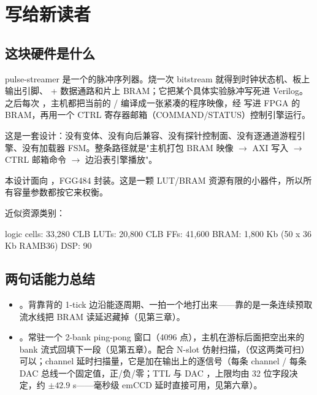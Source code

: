 \documentclass[11pt,oneside,openany]{book}
\begin{document}
\frontmatter
{}
\tableofcontents
\cleardoublepage
\mainmatter

\chapter{写给新读者}

\section{这块硬件是什么}
pulse-streamer 是一个的脉冲序列器。烧一次 bitstream 就得到时钟状态机、板上输出引脚、 +  数据通路和片上 BRAM；它把某个具体实验脉冲写死进 Verilog。之后每次 ，主机都把当前的 / 编译成一张紧凑的程序映像，经  写进 FPGA 的 BRAM，再用一个 CTRL 寄存器邮箱（COMMAND/STATUS）控制引擎运行。

这是一套设计：没有变体、没有向后兼容、没有探针控制面、没有逐通道游程引擎、没有加载器 FSM。整条路径就是"主机打包 BRAM 映像 $\rightarrow$ AXI 写入 $\rightarrow$ CTRL 邮箱命令 $\rightarrow$ 边沿表引擎播放"。

\begin{notebox}[目标器件]
本设计面向 ，FGG484 封装。这是一颗 LUT/BRAM 资源有限的小器件，所以所有容量参数都按它来权衡。
\end{notebox}

近似资源类别：

\begin{codeblock}[xc7a35tfgg484-2]
logic cells: 33,280     CLB LUTs: 20,800     CLB FFs: 41,600
BRAM:        1,800 Kb (50 x 36 Kb RAMB36)   DSP: 90
\end{codeblock}

\section{两句话能力总结}
\begin{itemize}
  \item {}。背靠背的 1-tick 边沿能逐周期、一拍一个地打出来——靠的是一条连续预取流水线把 BRAM 读延迟藏掉（见第三章）。
  \item {}。常驻一个 2-bank ping-pong 窗口（4096 点），主机在游标后面把空出来的 bank 流式回填下一段（见第五章）。配合 N-slot 仿射扫描，（仅这两类可扫）可以；channel 延时扫描量，它是加在输出上的逐信号（每条 channel / 每条 DAC 总线一个固定值，正/负/零；TTL 与 DAC ，上限均由 32 位字段决定，约 $\pm 42.9$ s——毫秒级 emCCD 延时直接可用，见第六章）。
\end{itemize}
\end{document}
